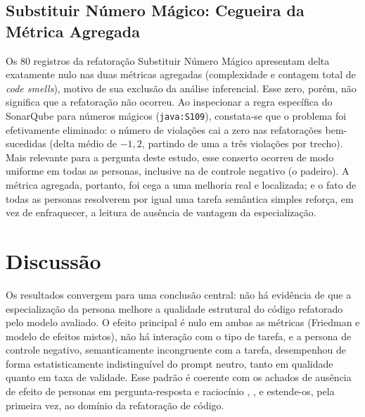 \documentclass[10pt,conference,a4paper,twocolumn]{article}
\begin{document}
\subsection{Substituir Número Mágico: Cegueira da Métrica Agregada}
Os 80 registros da refatoração Substituir Número Mágico apresentam delta exatamente nulo nas duas métricas agregadas (complexidade e contagem total de \textit{code smells}), motivo de sua exclusão da análise inferencial. Esse zero, porém, não significa que a refatoração não ocorreu. Ao inspecionar a regra específica do SonarQube para números mágicos (\texttt{java:S109}), constata-se que o problema foi efetivamente eliminado: o número de violações cai a zero nas refatorações bem-sucedidas (delta médio de $-1{,}2$, partindo de uma a três violações por trecho). Mais relevante para a pergunta deste estudo, esse conserto ocorreu de modo uniforme em todas as personas, inclusive na de controle negativo (o padeiro). A métrica agregada, portanto, foi cega a uma melhoria real e localizada; e o fato de todas as personas resolverem por igual uma tarefa semântica simples reforça, em vez de enfraquecer, a leitura de ausência de vantagem da especialização.

\section{Discussão}
Os resultados convergem para uma conclusão central: não há evidência de que a especialização da persona melhore a qualidade estrutural do código refatorado pelo modelo avaliado. O efeito principal é nulo em ambas as métricas (Friedman e modelo de efeitos mistos), não há interação com o tipo de tarefa, e a persona de controle negativo, semanticamente incongruente com a tarefa, desempenhou de forma estatisticamente indistinguível do prompt neutro, tanto em qualidade quanto em taxa de validade. Esse padrão é coerente com os achados de ausência de efeito de personas em pergunta-resposta e raciocínio \cite{zheng2024}, \cite{araujo2025}, e estende-os, pela primeira vez, ao domínio da refatoração de código.
\end{document}
